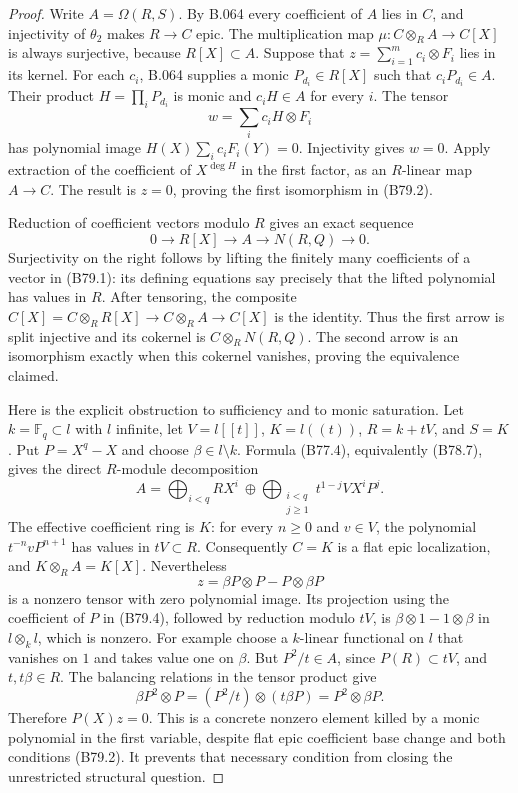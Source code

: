 \begin{proof}
Write $A=\Omega(R,S)$. By B.064 every coefficient of $A$ lies in $C$,
and injectivity of $\theta_2$ makes $R\to C$ epic.
The multiplication map $\mu:C\otimes_R A\to C[X]$ is always surjective,
because $R[X]\subset A$. Suppose that
$z=\sum_{i=1}^m c_i\otimes F_i$ lies in its kernel.
For each $c_i$, B.064 supplies a monic $P_{d_i}\in R[X]$ such that
$c_iP_{d_i}\in A$. Their product $H=\prod_iP_{d_i}$ is monic and
$c_iH\in A$ for every $i$. The tensor
\[
                         w=\sum_i c_iH\otimes F_i
\]
has polynomial image $H(X)\sum_i c_iF_i(Y)=0$. Injectivity gives $w=0$.
Apply extraction of the coefficient of $X^{\deg H}$ in the first
factor, as an $R$-linear map $A\to C$. The result is $z=0$, proving
the first isomorphism in (B79.2).

Reduction of coefficient vectors modulo $R$ gives an exact sequence
\[
                0\longrightarrow R[X]\longrightarrow A
                    \longrightarrow N(R,Q)\longrightarrow0.  \tag{B79.3}
\]
Surjectivity on the right follows by lifting the finitely many
coefficients of a vector in (B79.1): its defining equations say
precisely that the lifted polynomial has values in $R$.
After tensoring, the composite
$C[X]=C\otimes_RR[X]\to C\otimes_RA\to C[X]$ is the identity.
Thus the first arrow is split injective and its cokernel is
$C\otimes_RN(R,Q)$. The second arrow is an isomorphism exactly when
this cokernel vanishes, proving the equivalence claimed.

Here is the explicit obstruction to sufficiency and to monic
saturation. Let $k=\mathbb F_q\subset l$ with $l$ infinite, let
$V=l[[t]]$, $K=l((t))$, $R=k+tV$, and $S=K$. Put $P=X^q-X$ and choose
$\beta\in l\setminus k$. Formula (B77.4), equivalently (B78.7), gives
the direct $R$-module decomposition
\[
 A=\bigoplus_{i<q}RX^i\ \oplus\!
      \bigoplus_{\substack{i<q\\j\ge1}}t^{1-j}V X^iP^j.
                                                        \tag{B79.4}
\]
The effective coefficient ring is $K$: for every $n\ge0$ and
$v\in V$, the polynomial $t^{-n}vP^{n+1}$ has values in $tV\subset R$.
Consequently $C=K$ is a flat epic localization, and
$K\otimes_RA=K[X]$.
Nevertheless
\[
                       z=\beta P\otimes P-P\otimes\beta P
                                                        \tag{B79.5}
\]
is a nonzero tensor with zero polynomial image. Its projection using
the coefficient of $P$ in (B79.4), followed by reduction modulo $tV$,
is $\beta\otimes1-1\otimes\beta$ in $l\otimes_k l$, which is nonzero.
For example choose a $k$-linear functional on $l$ that vanishes on
$1$ and takes value one on $\beta$.
But $P^2/t\in A$, since $P(R)\subset tV$, and $t,t\beta\in R$.
The balancing relations in the tensor product give
\[
 \beta P^2\otimes P
       =(P^2/t)\otimes(t\beta P)
       =P^2\otimes\beta P.
                                                        \tag{B79.6}
\]
Therefore $P(X)z=0$. This is a concrete nonzero element killed by a
monic polynomial in the first variable, despite flat epic coefficient
base change and both conditions (B79.2). It prevents that necessary
condition from closing the unrestricted structural question.
\end{proof}
